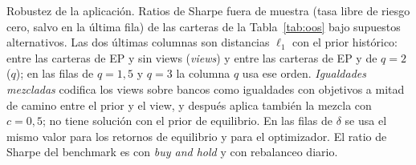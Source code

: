 \documentclass[11pt]{article}
\begin{document}
\begin{table}[h]
\centering
\footnotesize
\caption{Robustez de la aplicaci\'on. Ratios de Sharpe fuera de muestra
(tasa libre de riesgo cero, salvo en la \'ultima fila) de las carteras de la
Tabla~\ref{tab:oos} bajo supuestos alternativos. Las dos \'ultimas columnas son distancias $\ell_1$
con el prior hist\'orico: entre las carteras de EP y sin views
(\emph{views}) y entre las carteras de EP y de $q=2$ ($q$); en las filas
de $q = 1{,}5$ y $q=3$ la columna $q$ usa ese orden. \emph{Igualdades
mezcladas} codifica los views sobre bancos como igualdades con objetivos a
mitad de camino entre el prior y el view, y despu\'es aplica tambi\'en la
mezcla con $c=0{,}5$; no tiene soluci\'on con el prior de equilibrio. En las
filas de $\delta$ se usa el mismo valor para los retornos de equilibrio y
para el optimizador. El ratio de Sharpe del benchmark es \nShBench{} con
\emph{buy and hold} y \nShBenchDaily{} con rebalanceo diario.}
\label{tab:robust}

\end{table}
\end{document}
